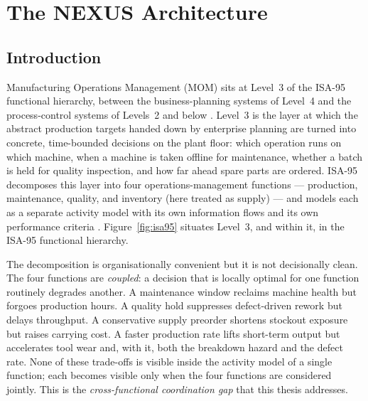 \chapter{The NEXUS Architecture}
\label{ch:architecture}

\section{Introduction}
\label{sec:arch-intro}

Manufacturing Operations Management (MOM) sits at Level~3 of the ISA-95
functional hierarchy, between the business-planning systems of Level~4
and the process-control systems of Levels~2 and below
\cite{isa95part1,sprock2019isa95}. Level~3 is the layer at which the
abstract production targets handed down by enterprise planning are
turned into concrete, time-bounded decisions on the plant floor: which
operation runs on which machine, when a machine is taken offline for
maintenance, whether a batch is held for quality inspection, and how far
ahead spare parts are ordered. ISA-95 decomposes this layer into four
operations-management functions --- production, maintenance, quality,
and inventory (here treated as supply) --- and models each as a
separate activity model with its own information flows and its own
performance criteria \cite{isa95part1}. Figure~\ref{fig:isa95} situates
Level~3, and \NEXUS{} within it, in the ISA-95 functional hierarchy.


The decomposition is organisationally convenient but it is not
decisionally clean. The four functions are \emph{coupled}: a decision
that is locally optimal for one function routinely degrades another. A
maintenance window reclaims machine health but forgoes production
hours. A quality hold suppresses defect-driven rework but delays
throughput. A conservative supply preorder shortens stockout exposure
but raises carrying cost. A faster production rate lifts short-term
output but accelerates tool wear and, with it, both the breakdown
hazard and the defect rate. None of these trade-offs is visible inside
the activity model of a single function; each becomes visible only when
the four functions are considered jointly. This is the
\emph{cross-functional coordination gap} that this thesis addresses.

